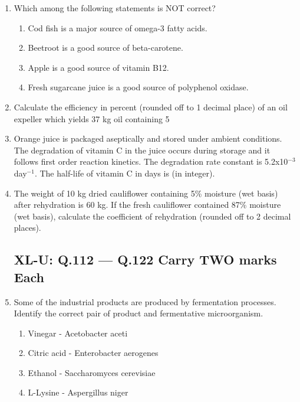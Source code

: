 \documentclass[journal,12pt,onecolumn]{IEEEtran}
\begin{document}
\begin{enumerate}
    \item Which among the following statements is NOT correct?
    \begin{enumerate}
        \item Cod fish is a major source of omega-3 fatty acids.
        \item Beetroot is a good source of beta-carotene.
        \item Apple is a good source of vitamin B12.
        \item Fresh sugarcane juice is a good source of polyphenol oxidase.
    \end{enumerate}

    \item Calculate the efficiency in percent (rounded off to 1 decimal place) of an oil expeller which yields 37 kg oil containing 5%

    \item Orange juice is packaged aseptically and stored under ambient conditions. The degradation of vitamin C in the juice occurs during storage and it follows first order reaction kinetics. The degradation rate constant is 5.2x10$^{-3}$ day$^{-1}$. The half-life of vitamin C in days is (in integer).

    \item The weight of 10 kg dried cauliflower containing 5\% moisture (wet basis) after rehydration is 60 kg. If the fresh cauliflower contained 87\% moisture (wet basis), calculate the coefficient of rehydration (rounded off to 2 decimal places).

\subsection*{XL-U: Q.112 --- Q.122 Carry TWO marks Each}

    \item Some of the industrial products are produced by fermentation processes. Identify the correct pair of product and fermentative microorganism.
    \begin{enumerate}
        \item Vinegar - Acetobacter aceti
        \item Citric acid - Enterobacter aerogenes
        \item Ethanol - Saccharomyces cerevisiae
        \item L-Lysine - Aspergillus niger
    \end{enumerate}


\end{enumerate}
\end{document}
